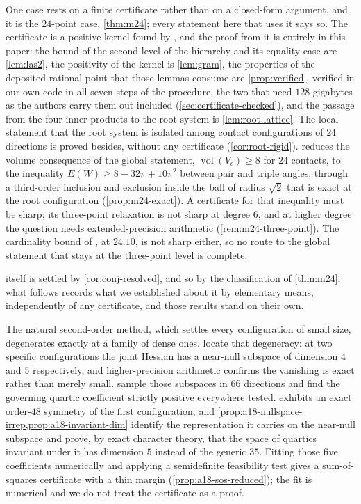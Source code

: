 \documentclass[11pt,reqno]{amsart}
\renewcommand{\_}{\origunderscore\allowbreak}
\numberwithin{equation}{section}
\theoremstyle{plain}
\theoremstyle{definition}
\theoremstyle{remark}
\DeclareMathOperator{\vol}{vol}
\begin{document}
One case rests on a finite certificate rather than on a closed-form
argument, and it is the $24$-point case, \cref{thm:m24}; every
statement here that uses it says so. The certificate is a positive kernel found by
\cite{LLM24}, and the proof from it is entirely in this paper: the bound
of the second level of the hierarchy and its equality case are
\cref{lem:las2}, the positivity of the kernel is \cref{lem:gram}, the
properties of the deposited rational point that those lemmas consume
are \cref{prop:verified}, verified in our own code in all seven steps of
the procedure, the two that need $128$ gigabytes as the authors carry
them out included (\cref{sec:certificate-checked}), and the passage from
the four inner products to the root system is \cref{lem:root-lattice}.
The local statement that the root system is isolated among contact
configurations of $24$ directions is proved besides, without any
certificate (\cref{cor:root-rigid}).  reduces the
volume consequence of the global statement, $\vol(V_c)\ge8$ for $24$
contacts, to the inequality $E(W)\ge8-32\pi+10\pi^2$ between pair and
triple angles, through a third-order inclusion and exclusion inside the
ball of radius $\sqrt2$ that is exact at the root configuration
(\cref{prop:m24-exact}). A certificate for that inequality must be
sharp; its three-point relaxation is not sharp at degree $6$, and at
higher degree the question needs extended-precision arithmetic
(\cref{rem:m24-three-point}). The cardinality bound of \cite{BV08}, at
$24.10$, is not sharp either, so no route to the global statement that
stays at the three-point level is complete.

 itself is settled by
\cref{cor:conj-resolved}, and so by the classification of \cref{thm:m24};
what follows records what we established about it by elementary means,
independently of any certificate, and those results stand on their own.

The natural second-order method, which settles every configuration of
small size, degenerates exactly at a family of dense ones.
locate that degeneracy: at two specific configurations the joint Hessian
has a near-null subspace of dimension $4$ and $5$ respectively, and
higher-precision arithmetic confirms the vanishing is exact rather than
merely small. 
sample those subspaces in $66$ directions and find the governing quartic
coefficient strictly positive everywhere tested.
 exhibits an exact order-$48$ symmetry of the
first configuration, and
\cref{prop:a18-nullspace-irrep,prop:a18-invariant-dim} identify the
representation it carries on the near-null subspace and prove, by exact
character theory, that the space of quartics invariant under it has dimension $5$ instead of the generic $35$. Fitting those five
coefficients numerically and applying a semidefinite feasibility test
gives a sum-of-squares certificate with a thin margin
(\cref{prop:a18-sos-reduced}); the fit is numerical and we do not treat
the certificate as a proof.
\end{document}
